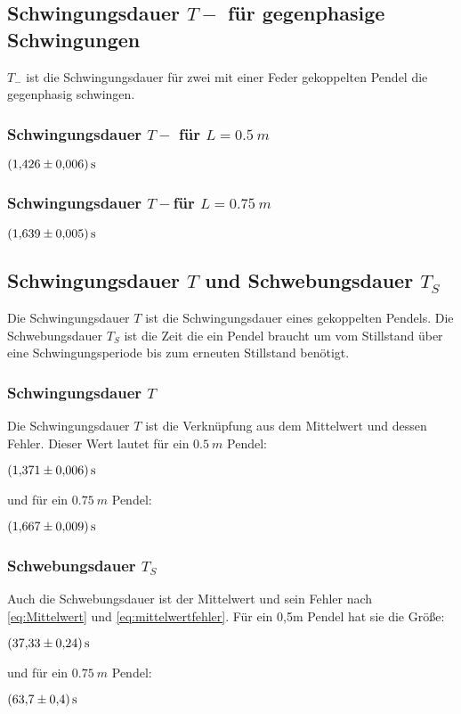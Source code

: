 \subsection{Schwingungsdauer $T-$ für gegenphasige Schwingungen}
$T_-$ ist die Schwingungsdauer für zwei mit einer Feder gekoppelten Pendel die gegenphasig schwingen.
\subsubsection{Schwingungsdauer $T-$ für $L=\SI{0,5}{m}$}
\label{sec:T-50}
\begin{center}
  $\SI{1.426\pm0.006}{s}$
\end{center}
\subsubsection{Schwingungsdauer $T-$für $L=\SI{0,75}{m}$}
\label{T-75}
\begin{center}
  $\SI{1.639\pm0.005}{s}$
\end{center}


\subsection{Schwingungsdauer $T$ und Schwebungsdauer $T_S$}
Die Schwingungsdauer $T$ ist die Schwingungsdauer eines gekoppelten Pendels. Die Schwebungsdauer $T_S$ ist 
die Zeit die ein Pendel braucht um vom Stillstand über eine Schwingungsperiode bis zum erneuten Stillstand 
benötigt.
\subsubsection{Schwingungsdauer $T$}
Die Schwingungsdauer $T$ ist die Verknüpfung aus dem Mittelwert und dessen Fehler.
Dieser Wert lautet für ein $\SI{0,5}{m}$ Pendel:
\begin{center}
  $\SI{1.371\pm0.006}{s}$
\end{center}
und für ein $\SI{0,75}{m}$ Pendel:
\begin{center}
  $\SI{1.667\pm0.009}{s}$
\end{center}
\subsubsection{Schwebungsdauer $T_S$}
Auch die Schwebungsdauer ist der Mittelwert und sein Fehler nach \autoref{eq:Mittelwert} und \autoref{eq:mittelwertfehler}.
Für ein 0,5m Pendel hat sie die Größe:
\begin{center}
  $\SI{37.33\pm0.24}{s}$
\end{center}
und für ein $\SI{0,75}{m}$ Pendel:
\begin{center}
  $\SI{63,7\pm0,4}{s}$
\end{center}


